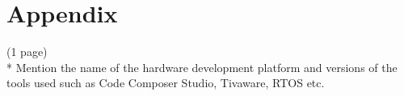\chapter{Appendix}

(1 page)\\
* Mention the name of the hardware development platform and versions of the tools used such as Code Composer Studio, Tivaware, RTOS etc.